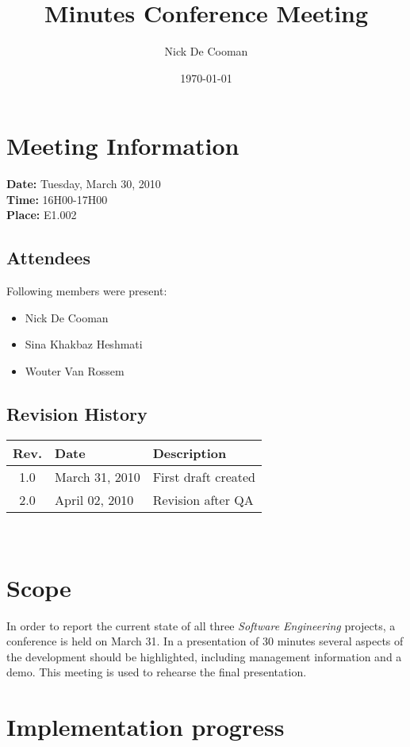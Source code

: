 \documentclass[a4paper, 12pt]{article}
\begin{document}
\title{Minutes Conference Meeting}
\author{Nick De Cooman}
\date{\today}

\maketitle	
	\section{Meeting Information}
		\textbf{Date:} Tuesday, March 30, 2010\\
		\textbf{Time:} 16H00-17H00\\
		\textbf{Place:} E1.002
		
		\subsection{Attendees}
Following members were present:
			\begin{itemize}
				\item Nick De Cooman
				\item Sina Khakbaz Heshmati
				\item Wouter Van Rossem
			\end{itemize}
			
		\subsection{Revision History}
			\begin{tabular}{c | l | l }
				\textbf{Rev.} & \textbf{Date} & \textbf{Description} \\
				\hline
				1.0 & March 31, 2010 & First draft created \\
				2.0 & April 02, 2010 & Revision after QA

			\end{tabular}	
			\\	

\section{Scope}

In order to report the current state of all three \emph{Software Engineering} projects, a conference is held on March 31. In a presentation of 30 minutes several aspects of the development should be highlighted, including management information and a demo. This meeting is used to rehearse the final presentation. 

\section{Implementation progress}
\end{document}
